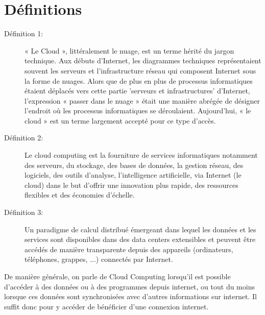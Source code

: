 \section{Définitions}

\begin{description}
	\item[Définition 1:]« Le Cloud », littéralement le nuage, est un terme hérité du jargon technique. Aux débuts d'Internet, les diagrammes techniques représentaient souvent les serveurs et l'infrastructure réseau qui composent Internet sous la forme de nuages. Alors que de plus en plus de processus informatiques étaient déplacés vers cette partie 'serveurs et infrastructures' d'Internet, l'expression « passer dans le nuage » était une manière abrégée de désigner l'endroit où les processus informatiques se déroulaient. Aujourd'hui, « le cloud » est un terme largement accepté pour ce type d'accès.
	\item[Définition 2:] Le cloud computing est la fourniture de services informatiques notamment des serveurs, du stockage, des bases de données, la gestion réseau, des logiciels, des outils d'analyse, l'intelligence artificielle,  via Internet (le cloud) dans le but d'offrir une innovation plus rapide, des ressources flexibles et des économies d'échelle. 
	\item[Définition 3:] Un paradigme de calcul distribué émergeant dans lequel les données et les services
sont disponibles dans des data centers extensibles et peuvent être accédés de manière transparente depuis des appareils (ordinateurs, téléphones, grappes, ...) connectés par Internet.
\end{description}

De manière générale, on parle de Cloud Computing lorsqu’il est possible d’accéder à des données ou à des programmes depuis internet, ou tout du moins lorsque ces données sont synchronisées avec d’autres informations sur internet. Il suffit donc pour y accéder de bénéficier d’une connexion internet.
